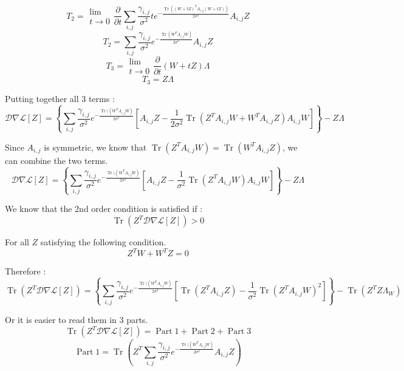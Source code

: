 \documentclass{article}
\newcommand{\nobracket}{}
\newcommand{\tmop}[1]{\ensuremath{\operatorname{#1}}}
\begin{document}
\[ T_2 = \begin{array}{l}
     \lim\\
     t \rightarrow 0
   \end{array} \frac{\partial}{\partial t} \sum_{i, j} \frac{\gamma_{i,
   j}}{\sigma^2} t e^{- \frac{\tmop{Tr} ( ( W + t Z)^T A_{i, j}  ( W + t
   Z))}{2 \sigma^2}} A_{i, j} Z \]
\[ T_2 = \sum_{i, j} \frac{\gamma_{i, j}}{\sigma^2} e^{- \frac{\tmop{Tr} (W^T
   A_{i, j} W)}{2 \sigma^2}} A_{i, j} Z \]
\[ T_3 = \begin{array}{l}
     \lim\\
     t \rightarrow 0
   \end{array} \frac{\partial}{\partial t}  ( W + t Z) \Lambda \]
\[ T_3 = Z \Lambda \]


Putting together all 3 terms :
\[ \mathcal{D} \nabla \mathcal{L} [ Z] = \left\{ \sum_{i, j} \frac{\gamma_{i,
   j}}{\sigma^2} e^{- \frac{\tmop{Tr} ( ( W^T A_{i, j} W \nobracket)}{2
   \sigma^2}}  \left[ A_{i, j} Z - \frac{1}{2 \sigma^2} \tmop{Tr} ( Z^T A_{i,
   j} W + W^T A_{i, j} Z) A_{i, j} W \right] \right\} - Z \Lambda \]


Since $A_{i, j}$ is symmetric, we know that $\tmop{Tr} ( Z^T A_{i, j} W) =
\tmop{Tr} ( W^T A_{i, j} Z)$, we can combine the two terms.
\[ \mathcal{D} \nabla \mathcal{L} [ Z] = \left\{ \sum_{i, j} \frac{\gamma_{i,
   j}}{\sigma^2} e^{- \frac{\tmop{Tr} ( ( W^T A_{i, j} W \nobracket)}{2
   \sigma^2}}  \left[ A_{i, j} Z - \frac{1}{\sigma^2} \tmop{Tr} ( Z^T A_{i, j}
   W) A_{i, j} W \right] \right\} - Z \Lambda \]




We know that the 2nd order condition is satisfied if :
\begin{equation}
  \tmop{Tr} ( Z^T \mathcal{D} \nabla \mathcal{L} [ Z]) > 0
\end{equation}


For all $Z$ satisfying the following condition.
\begin{equation}
  Z^T W + W^T Z = 0
\end{equation}


Therefore :
\[ \tmop{Tr} ( Z^T \mathcal{D} \nabla \mathcal{L} [ Z]) = \left\{ \sum_{i, j}
   \frac{\gamma_{i, j}}{\sigma^2} e^{- \frac{\tmop{Tr} ( ( W^T A_{i, j} W
   \nobracket)}{2 \sigma^2}}  \left[ \tmop{Tr} ( Z^T A_{i, j} Z) -
   \frac{1}{\sigma^2} \tmop{Tr} ( Z^T A_{i, j} W)^2 \right] \right\} -
   \tmop{Tr} ( Z^T Z \Lambda_W) \]


Or it is easier to read them in 3 parts.
\[ \tmop{Tr} ( Z^T \mathcal{D} \nabla \mathcal{L} [ Z]) = \tmop{Part} 1 +
   \tmop{Part} 2 + \tmop{Part} 3 \]
\[ \tmop{Part} 1 = \tmop{Tr} \left( Z^T \sum_{i, j} \frac{\gamma_{i,
   j}}{\sigma^2} e^{- \frac{\tmop{Tr} ( ( W^T A_{i, j} W \nobracket)}{2
   \sigma^2}} A_{i, j} Z \right) \]
\end{document}

